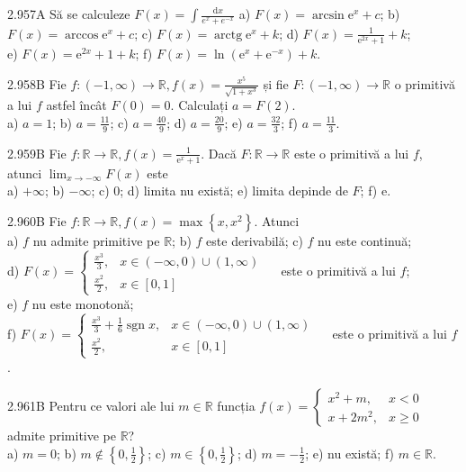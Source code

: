 \documentclass[11pt]{article}
\begin{document}
2.957A Să se calculeze $F(x)=\int \frac{\mathrm{d} x}{e^{x}+e^{-x}}$ a) $F(x)=\arcsin \mathrm{e}^{x}+c$; b) $F(x)=\arccos \mathrm{e}^{x}+c$; c) $F(x)=\operatorname{arctg} \mathrm{e}^{x}+k$; d) $F(x)=\frac{1}{\mathrm{e}^{2 x}+1}+k$;\\ e) $F(x)=\mathrm{e}^{2 x}+1+k$; f) $F(x)=\ln \left(\mathrm{e}^{x}+\mathrm{e}^{-x}\right)+k$.

2.958B Fie $f:(-1, \infty) \rightarrow \mathbb{R}, f(x)=\frac{x^{5}}{\sqrt{1+x^{3}}}$ și fie $F:(-1, \infty) \rightarrow \mathbb{R}$ o primitivă a lui $f$ astfel încât $F(0)=0$. Calculați $a=F(2)$.\\ a) $a=1$; b) $a=\frac{11}{9}$; c) $a=\frac{40}{9}$; d) $a=\frac{20}{9}$; e) $a=\frac{32}{3}$; f) $a=\frac{11}{3}$.

2.959B Fie $f: \mathbb{R} \rightarrow \mathbb{R}, f(x)=\frac{1}{\mathrm{e}^{x}+1}$. Dacă $F: \mathbb{R} \rightarrow \mathbb{R}$ este o primitivă a lui $f$, atunci $\lim _{x \rightarrow-\infty} F(x)$ este\\ a) $+\infty$; b) $-\infty$; c) $0$; d) limita nu există; e) limita depinde de $F$; f) $\mathrm{e}$.

2.960B Fie $f: \mathbb{R} \rightarrow \mathbb{R}, f(x)=\max \left\{x, x^{2}\right\}$. Atunci\\ a) $f$ nu admite primitive pe $\mathbb{R}$; b) $f$ este derivabilă; c) $f$ nu este continuă;\\ d) $F(x)=\left\{\begin{array}{cc}\frac{x^{3}}{3}, & x \in(-\infty, 0) \cup(1, \infty) \\ \frac{x^{2}}{2}, & x \in[0,1]\end{array} \quad\right.$ este o primitivă a lui $f$;\\ e) $f$ nu este monotonă;\\ f) $F(x)=\left\{\begin{array}{ll}\frac{x^{3}}{3}+\frac{1}{6} \operatorname{sgn} x, & x \in(-\infty, 0) \cup(1, \infty) \\ \frac{x^{2}}{2}, & x \in[0,1]\end{array} \quad\right.$ este o primitivă a lui $f$.

2.961B Pentru ce valori ale lui $m \in \mathbb{R}$ funcția $f(x)= \begin{cases}x^{2}+m, & x<0 \\ x+2 m^{2}, & x \geq 0\end{cases}$ admite primitive pe $\mathbb{R}$?\\ a) $m=0$; b) $m \notin\left\{0, \frac{1}{2}\right\}$; c) $m \in\left\{0, \frac{1}{2}\right\}$; d) $m=-\frac{1}{2}$; e) nu există; f) $m \in \mathbb{R}$.
\end{document}
